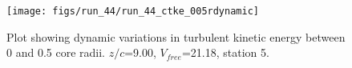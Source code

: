 \begin{figure}[H]
\centering
\texttt{[image: figs/run\_44/run\_44\_ctke\_005rdynamic]}
\caption{Plot showing dynamic variations in turbulent kinetic energy between 0 and 0.5 core radii. $z/c$=9.00, $V_{free}$=21.18, station 5.}
\label{fig:run_44_ctke_005rdynamic}
\end{figure}


